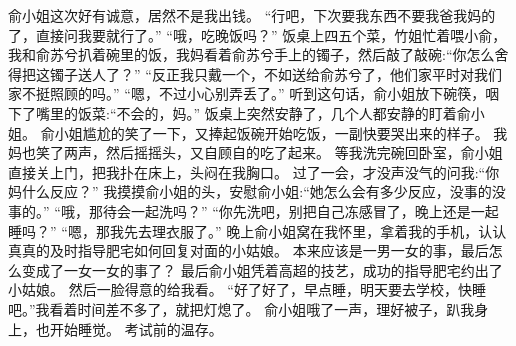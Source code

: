 俞小姐这次好有诚意，居然不是我出钱。
“行吧，下次要我东西不要我爸我妈的了，直接问我要就行了。”
“哦，吃晚饭吗？”
饭桌上四五个菜，竹姐忙着喂小俞，我和俞苏兮扒着碗里的饭，我妈看着俞苏兮手上的镯子，然后敲了敲碗:“你怎么舍得把这镯子送人了？”
“反正我只戴一个，不如送给俞苏兮了，他们家平时对我们家不挺照顾的吗。”
“嗯，不过小心别弄丢了。”
听到这句话，俞小姐放下碗筷，咽下了嘴里的饭菜:“不会的，妈。”
饭桌上突然安静了，几个人都安静的盯着俞小姐。
俞小姐尴尬的笑了一下，又捧起饭碗开始吃饭，一副快要哭出来的样子。
我妈也笑了两声，然后摇摇头，又自顾自的吃了起来。
等我洗完碗回卧室，俞小姐直接关上门，把我扑在床上，头闷在我胸口。
过了一会，才没声没气的问我:“你妈什么反应？”
我摸摸俞小姐的头，安慰俞小姐:“她怎么会有多少反应，没事的没事的。”
“哦，那待会一起洗吗？”
“你先洗吧，别把自己冻感冒了，晚上还是一起睡吗？”
“嗯，那我先去理衣服了。”
晚上俞小姐窝在我怀里，拿着我的手机，认认真真的及时指导肥宅如何回复对面的小姑娘。
本来应该是一男一女的事，最后怎么变成了一女一女的事了？
最后俞小姐凭着高超的技艺，成功的指导肥宅约出了小姑娘。
然后一脸得意的给我看。
“好了好了，早点睡，明天要去学校，快睡吧。”我看着时间差不多了，就把灯熄了。
俞小姐哦了一声，理好被子，趴我身上，也开始睡觉。
考试前的温存。

